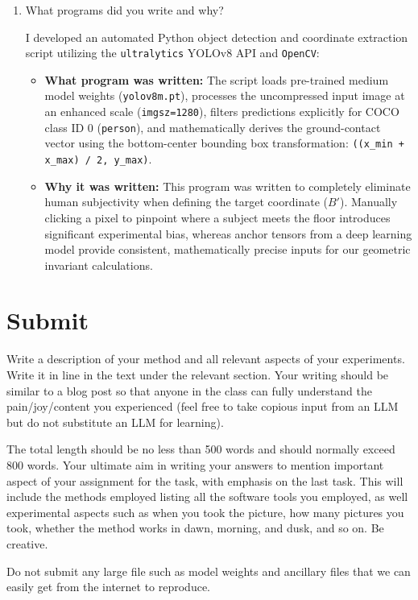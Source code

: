 \begin{enumerate}
\item What programs did you write and why?  

\begin{studentSpace}
I developed an automated Python object detection and coordinate extraction script utilizing the \texttt{ultralytics} YOLOv8 API and \texttt{OpenCV}:
\begin{itemize}
    \item \textbf{What program was written:} The script loads pre-trained medium model weights (\texttt{yolov8m.pt}), processes the uncompressed input image at an enhanced scale (\texttt{imgsz=1280}), filters predictions explicitly for COCO class ID 0 (\texttt{person}), and mathematically derives the ground-contact vector using the bottom-center bounding box transformation: \texttt{((x\_min + x\_max) / 2, y\_max)}.
    \item \textbf{Why it was written:} This program was written to completely eliminate human subjectivity when defining the target coordinate ($B'$). Manually clicking a pixel to pinpoint where a subject meets the floor introduces significant experimental bias, whereas anchor tensors from a deep learning model provide consistent, mathematically precise inputs for our geometric invariant calculations.
\end{itemize}
\end{studentSpace}

\end{enumerate}

\section{Submit}

Write a description of your method and all relevant aspects of your
experiments. Write it in line in the text under the relevant section.  Your writing should be similar to  a blog post so that anyone in the class can fully understand the pain/joy/content you experienced (feel free to take copious input from an LLM but do not substitute an LLM for learning).

The total length should be no less than 500 words and
should normally exceed 800 words.  Your ultimate aim in writing your answers
to mention important aspect of your assignment for the task, with
emphasis on the last task.  This will include the methods employed
listing all the software tools you employed, as well experimental
aspects such as when you took the picture, how many pictures 
you took, whether the method works in dawn, morning, and dusk, and so
on. Be creative.  

Do not submit any large file such as
model weights and ancillary files that we can easily get from the
internet to reproduce.
